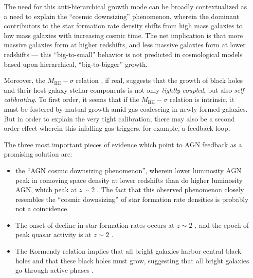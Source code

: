 The need for this anti-hierarchical growth mode can be broadly contextualized
as a need to explain the ``cosmic downsizing'' phenomenon, wherein the dominant contributors 
to the star formation rate density shifts from high mass galaxies to low mass galaxies with increasing cosmic time. 
The net implication is that more massive galaxies form at higher redshifts, and less massive galaxies form at lower redshifts --- this ``big-to-small'' behavior is not predicted in cosmological models based upon hierarchical, ``big-to-bigger'' growth.

 
Moreover, the $M_\mathrm{BH}-\sigma$ relation \citep{magorrian98,ferrarese00,gebhardt00}, if real, 
suggests that 
the growth of black holes and their host galaxy stellar components is not only {\it tightly coupled}, but also {\it self calibrating}. 
To first order, it seems that if the  $M_\mathrm{BH}-\sigma$ relation is intrinsic, it must be fostered 
by mutual growth amid gas coalescing in newly formed galaxies. But in order to explain the very tight calibration, 
there may also be a second order effect wherein this infalling gas triggers, for example, a feedback loop. 

The three most important pieces of evidence which point to AGN  feedback as a promising solution are: 

\begin{itemize}

\item the ``AGN cosmic downsizing phenomenon'', wherein lower luminosity AGN peak in  
comoving space density at lower redshifts than do higher luminosity AGN, which peak at $z\sim2$ \citep{giacconi02,cowie03,steffen03,hopkins07}. The 
fact that this observed phenomenon closely resembles the ``cosmic downsizing'' of star formation rate densities is probably 
not a coincidence. 

\item The onset of decline in star formation rates occurs at $z\sim2$ \citep{perezgonzalez07}, and  
the epoch of peak quasar activity is at  $z\sim2$ \citep{schmidt91,steffen03,hopkins07}. 

\item The Kormendy relation implies that all bright galaxies harbor central black holes and that 
these black holes must grow, suggesting that all bright galaxies go through active phases \citep{kormendy95,haehnelt93}.

\end{itemize}




